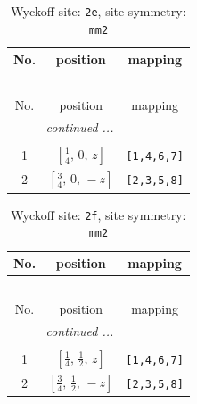 \documentclass[fleqn,8pt]{jsarticle}
\begin{document}
\begin{longtable}{ccc}
\caption{Wyckoff site: {\tt 2e}, site symmetry: {\tt mm2}}
 \\
 \hline \hline
No. & position & mapping \\ \hline \endfirsthead

\multicolumn{2}{l}{\tablename\ \thetable{}} \\
 \hline \hline
No. & position & mapping \\ \hline \endhead

 \hline \hline
\multicolumn{2}{r}{\footnotesize\it continued ...} \\ \endfoot

 \hline \hline
\multicolumn{2}{r}{} \\ \endlastfoot

1 & $\left[ \frac{1}{4},\, 0,\, z \right]$ & {\tt [1,4,6,7]} \\ \hline
2 & $\left[ \frac{3}{4},\, 0,\, - z \right]$ & {\tt [2,3,5,8]} \\
\end{longtable}
\renewcommand{\arraystretch}{1.2}
\begin{longtable}{ccc}
\caption{Wyckoff site: {\tt 2f}, site symmetry: {\tt mm2}}
 \\
 \hline \hline
No. & position & mapping \\ \hline \endfirsthead

\multicolumn{2}{l}{\tablename\ \thetable{}} \\
 \hline \hline
No. & position & mapping \\ \hline \endhead

 \hline \hline
\multicolumn{2}{r}{\footnotesize\it continued ...} \\ \endfoot

 \hline \hline
\multicolumn{2}{r}{} \\ \endlastfoot

1 & $\left[ \frac{1}{4},\, \frac{1}{2},\, z \right]$ & {\tt [1,4,6,7]} \\ \hline
2 & $\left[ \frac{3}{4},\, \frac{1}{2},\, - z \right]$ & {\tt [2,3,5,8]} \\
\end{longtable}
\renewcommand{\arraystretch}{1.2}
\end{document}
